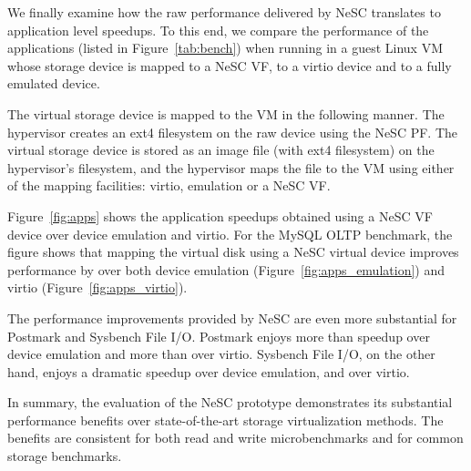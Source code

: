 We finally examine how the raw performance delivered by NeSC translates to application level speedups. To this end, we compare the performance of the  applications (listed in Figure~\ref{tab:bench}) when running in a guest Linux VM whose storage device is mapped to a NeSC VF, to a virtio device and to a fully emulated device.

The virtual storage device is mapped to the VM in the following manner. The hypervisor creates an ext4 filesystem on the raw device using the NeSC PF. The virtual storage device is stored as an image file (with ext4 filesystem) on  the hypervisor's filesystem, and the hypervisor maps the file to the VM using either of the mapping facilities: virtio, emulation or a NeSC VF.

Figure~\ref{fig:apps} shows the application speedups obtained using a NeSC VF device over device emulation and virtio. For the MySQL OLTP benchmark, the figure shows that mapping the virtual disk using a NeSC virtual device improves performance by  over both device emulation (Figure~\ref{fig:apps_emulation}) and virtio (Figure~\ref{fig:apps_virtio}).

The performance improvements provided by NeSC are even more substantial for Postmark and Sysbench File I/O.
Postmark enjoys more than  speedup over device emulation and more than  over virtio. Sysbench File I/O, on the other hand, enjoys a dramatic  speedup over device emulation, and  over virtio.

In summary, the evaluation of the NeSC prototype demonstrates its substantial performance benefits over state-of-the-art storage virtualization methods. The benefits are consistent for both read and write microbenchmarks and for common storage benchmarks.

